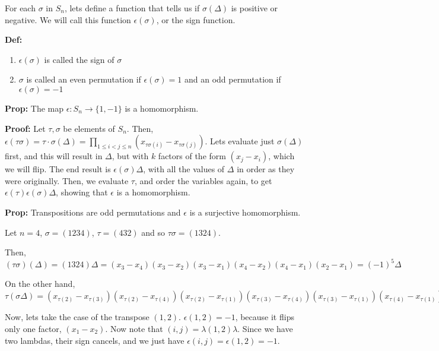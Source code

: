 \documentclass{article}
\begin{document}
For each $\sigma$ in $S_n$, lets define a function that tells us if $\sigma(\Delta)$ is positive or negative. We will call this function $\epsilon(\sigma)$, or the sign function.

\textbf{Def:} 
\begin{enumerate}
    \item $\epsilon(\sigma)$ is called the sign of $\sigma$
    \item $\sigma$ is called an even permutation if $\epsilon(\sigma) = 1$ and an odd permutation if $\epsilon(\sigma) = -1$
\end{enumerate}

\textbf{Prop:} The map $\epsilon: S_n \rightarrow \{1,-1\}$ is a homomorphism. 

\textbf{Proof:} Let $\tau, \sigma$ be elements of $S_n$. Then, $\epsilon(\tau\sigma) = \tau \cdot \sigma (\Delta) = \prod_{1\leq i < j \leq n} (x_{\tau\sigma(i)} - x_{\tau\sigma(j)})$. Lets evaluate just $\sigma(\Delta)$ first, and this will result in $\Delta$, but with $k$ factors of the form $(x_j - x_i)$, which we will flip. The end result is $\epsilon(\sigma) \Delta$, with all the values of $\Delta$ in order as they were originally. Then, we evaluate $\tau$, and order the variables again, to get $\epsilon(\tau)\epsilon(\sigma) \Delta$, showing that $\epsilon$ is a homomorphism. 

\textbf{Prop:} Transpositions are odd permutations and $\epsilon$ is a surjective homomorphism.

\begin{customproof}

Let $n = 4$, $\sigma = (1234)$, $\tau = (432)$ and so $\tau\sigma = (1324)$. 

Then, $(\tau\sigma)(\Delta) = (1324)\Delta = (x_3 - x_4)(x_3 - x_2)(x_3 - x_1)(x_4-x_2)(x_4-x_1)(x_2-x_1) = (-1)^5\Delta$

On the other hand, $\tau(\sigma\Delta) = (x_{\tau(2)} - x_{\tau(3)})(x_{\tau(2)} - x_{\tau(4)})(x_{\tau(2)} - x_{\tau(1)})(x_{\tau(3)} - x_{\tau(4)})(x_{\tau(3)} - x_{\tau(1)})(x_{\tau(4)} - x_{\tau(1)}) = (x_3 - x_4)(x_3 - x_2)(x_3 - x_1)(x_4 - x_2)(x_4 - x_1)(x_2 - x_1) = (-1)^{5}(\Delta)$

Now, lets take the case of the transpose $(1,2)$. $\epsilon (1,2) = -1$, because it flips only one factor, $(x_1 - x_2)$. Now note that $(i,j) = \lambda(1,2)\lambda$. Since we have two lambdas, their sign cancels, and we just have $\epsilon(i,j) = \epsilon (1,2) = -1$.
\end{customproof}
\end{document}
